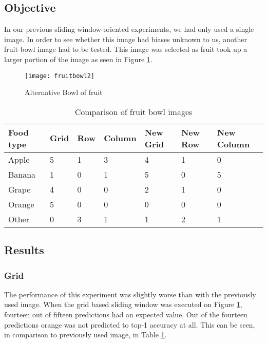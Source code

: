 \tocless\subsection{Objective}
In our previous sliding window-oriented experiments, we had only used a
single image. In order to see whether this image had biases unknown
to us, another fruit bowl image had to be tested. This image was selected as
fruit took up a larger portion of the image as seen in Figure \ref{fig:newFruit}.

\begin{figure}[h]
\centering
    \texttt{[image: fruitbowl2]}
    \caption{Alternative Bowl of fruit}
    \label{fig:newFruit}
\end{figure}

\begin{table}[]
    \centering
    \caption{Comparison of fruit bowl images}
    \label{newFruitTable}
    \begin{tabular}{|l|l|l|l|p{1.25cm}|p{1.25cm}|p{2cm}|}
    \hline
        \textbf{Food type} & \textbf{Grid} & \textbf{Row} & \textbf{Column} & \textbf{New Grid} & \textbf{New Row} & \textbf{New Column} \\ \hline
        Apple     & 5    & 1   & 3      & 4        & 1       & 0          \\ \hline
        Banana    & 1    & 0   & 1      & 5        & 0       & 5          \\ \hline
        Grape     & 4    & 0   & 0      & 2        & 1       & 0          \\ \hline
        Orange    & 5    & 0   & 0      & 0        & 0       & 0          \\ \hline
        Other     & 0    & 3   & 1      & 1        & 2       & 1         \\ \hline
    \end{tabular}
\end{table}

\tocless\subsection{Results}
\tocless\subsubsection{Grid}
The performance of this experiment was slightly worse than with the previously
used image. When the grid based sliding window was executed on Figure
\ref{fig:newFruit}, fourteen out of fifteen predictions had an expected value.
Out of the fourteen predictions orange was not predicted to top-1 accuracy at
all. This can be seen, in comparison to previously used image, in Table
\ref{newFruitTable}.

